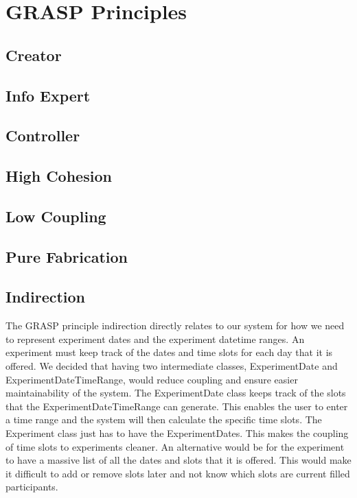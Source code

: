 \section{GRASP Principles}
\subsection{Creator}

\subsection{Info Expert}

\subsection{Controller}

\subsection{High Cohesion}

\subsection{Low Coupling}

\subsection{Pure Fabrication}

\subsection{Indirection}
The GRASP principle indirection directly relates to our system for how we need to represent experiment dates and the experiment datetime ranges. An experiment must keep track of the dates and time slots for each day that it is offered. We decided that having two intermediate classes, ExperimentDate and ExperimentDateTimeRange, would reduce coupling and ensure easier maintainability of the system. The ExperimentDate class keeps track of the slots that the ExperimentDateTimeRange can generate. This enables the user to enter a time range and the system will then calculate the specific time slots. The Experiment class just has to have the ExperimentDates. This makes the coupling of time slots to experiments cleaner. An alternative would be for the experiment to have a massive list of all the dates and slots that it is offered. This would make it difficult to add or remove slots later and not know which slots are current filled participants.

